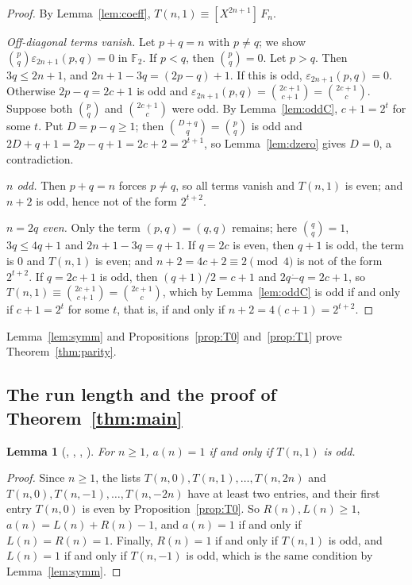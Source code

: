 \documentclass[11pt]{amsart}
\theoremstyle{plain}
\newtheorem{lemma}[theorem]{Lemma}
\theoremstyle{definition}
\newcommand{\F}{\mathbb{F}_2}
\newcommand{\tsub}{\mathbin{\dot{-}}}
\newcommand{\co}[2]{[X^{#1}]\,#2}
\begin{document}
\begin{proof}
By Lemma~\ref{lem:coeff}, $T(n,1)\equiv\co{2n+1}{F_n}$.

\emph{Off-diagonal terms vanish.} Let $p+q=n$ with $p\ne q$; we show $\binom pq\varepsilon_{2n+1}(p,q)=0$ in $\F$. If $p<q$, then $\binom pq=0$. Let $p>q$. Then $3q\le2n+1$, and $2n+1-3q=(2p-q)+1$. If this is odd, $\varepsilon_{2n+1}(p,q)=0$. Otherwise $2p-q=2c+1$ is odd and $\varepsilon_{2n+1}(p,q)=\binom{2c+1}{c+1}=\binom{2c+1}{c}$.
Suppose both $\binom pq$ and $\binom{2c+1}{c}$ were odd. By Lemma~\ref{lem:oddC}, $c+1=2^t$ for some $t$. Put $D=p-q\ge1$; then $\binom{D+q}{q}=\binom pq$ is odd and $2D+q+1=2p-q+1=2c+2=2^{t+1}$, so Lemma~\ref{lem:dzero} gives $D=0$, a contradiction.

\emph{$n$ odd.} Then $p+q=n$ forces $p\ne q$, so all terms vanish and $T(n,1)$ is even; and $n+2$ is odd, hence not of the form $2^{t+2}$.

\emph{$n=2q$ even.} Only the term $(p,q)=(q,q)$ remains; here $\binom qq=1$, $3q\le 4q+1$ and $2n+1-3q=q+1$.
If $q=2c$ is even, then $q+1$ is odd, the term is $0$ and $T(n,1)$ is even; and $n+2=4c+2\equiv2\pmod4$ is not of the form $2^{t+2}$.
If $q=2c+1$ is odd, then $(q+1)/2=c+1$ and $2q\tsub q=2c+1$, so $T(n,1)\equiv\binom{2c+1}{c+1}=\binom{2c+1}{c}$, which by Lemma~\ref{lem:oddC} is odd if and only if $c+1=2^t$ for some $t$, that is, if and only if $n+2=4(c+1)=2^{t+2}$.
\end{proof}

Lemma~\ref{lem:symm} and Propositions~\ref{prop:T0} and~\ref{prop:T1} prove Theorem~\ref{thm:parity}.

\subsection{\texorpdfstring{The run length and the proof of Theorem~\ref{thm:main}}{The run length and the proof of Theorem 3}}

\begin{lemma}[, , , ]\label{lem:run}
For $n\ge1$, $a(n)=1$ if and only if $T(n,1)$ is odd.
\end{lemma}

\begin{proof}
Since $n\ge1$, the lists $T(n,0),T(n,1),\dots,T(n,2n)$ and $T(n,0),T(n,-1),\dots,T(n,-2n)$ have at least two entries, and their first entry $T(n,0)$ is even by Proposition~\ref{prop:T0}. So $R(n),L(n)\ge1$, $a(n)=L(n)+R(n)-1$, and $a(n)=1$ if and only if $L(n)=R(n)=1$. Finally, $R(n)=1$ if and only if $T(n,1)$ is odd, and $L(n)=1$ if and only if $T(n,-1)$ is odd, which is the same condition by Lemma~\ref{lem:symm}.
\end{proof}
\end{document}
